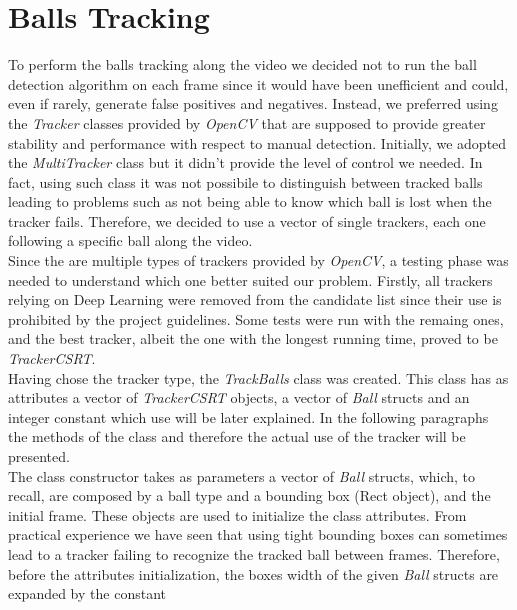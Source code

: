 \section{Balls Tracking}

To perform the balls tracking along the video we decided not to run the ball detection algorithm on each frame since it would have been unefficient and could, even if rarely, generate false positives and negatives.
Instead, we preferred using the \textit{Tracker} classes provided by \textit{OpenCV} that are supposed to provide greater stability and performance with respect to manual detection.
Initially, we adopted the \textit{MultiTracker} class but it didn't provide the level of control we needed. In fact, using such class it was not possibile to distinguish
between tracked balls leading to problems such as not being able to know which ball is lost when the tracker fails. Therefore, we decided to use a vector of single trackers,
each one following a specific ball along the video.
\newline \\
Since the are multiple types of trackers provided by \textit{OpenCV}, a testing phase was needed to understand which one better suited our problem. Firstly, all trackers
relying on Deep Learning were removed from the candidate list since their use is prohibited by the project guidelines. Some tests were run with the remaing ones, and the best tracker,
albeit the one with the longest running time, proved to be \textit{TrackerCSRT}.
\newline \\
Having chose the tracker type, the \textit{TrackBalls} class was created. This class has as attributes a vector of \textit{TrackerCSRT} objects, a vector of \textit{Ball} structs
and an integer constant which use will be later explained. In the following paragraphs the methods of the class and therefore the actual use of the tracker will be presented.
\newline \\
The class constructor takes as parameters a vector of \textit{Ball} structs, which, to recall, are composed by a ball type and a bounding box (Rect object), and the initial frame.
These objects are used to initialize the class attributes. From practical experience we have seen that using tight bounding boxes can sometimes lead to a tracker failing
to recognize the tracked ball between frames. Therefore, before the attributes initialization, the boxes width of the given \textit{Ball} structs are expanded by the constant
